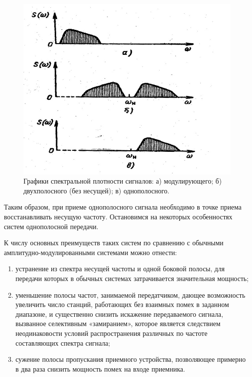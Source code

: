 \begin{figure}[h!]
	\centering
	\includegraphics[scale=1.5]{fig/fig4}
	\caption{ Графики спектральной плотности сигналов: а) модулирующего;
б) двухполосного (без несущей); в) однополосного.}
	\label{fig:fig4}
\end{figure}

Таким образом, при приеме однополосного сигнала необходимо в точке приема восстанавливать несущую частоту. Остановимся на некоторых особенностях систем однополосной передачи.

К числу основных преимуществ таких систем по сравнению с обычными
амплитудно-модулированными системами можно отнести:
\begin{enumerate}
	\item устранение из спектра несущей частоты и одной боковой полосы, для
передачи которых в обычных системах затрачивается значительная мощность;
	\item уменьшение полосы частот, занимаемой передатчиком, дающее возможность увеличить число станций, работающих без взаимных помех в заданном диапазоне, и существенно снизить искажение передаваемого сигнала, вызванное селективным «замиранием», которое является следствием неодинаковости условий распространения различных по частоте составляющих
спектра сигнала;
	\item сужение полосы пропускания приемного устройства, позволяющее примерно в два раза снизить мощность помех на входе приемника. 
\end{enumerate}

